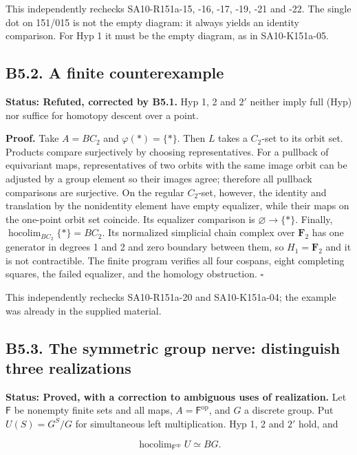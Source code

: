 This independently rechecks SA10-R151a-15, -16, -17, -19, -21 and -22.
The single dot on 151/015 is not the empty diagram: it always yields an
identity comparison. For Hyp 1 it must be the empty diagram, as in
SA10-K151a-05.

\subsection{B5.2. A finite
counterexample}\label{b5.2.-a-finite-counterexample}

\textbf{Status: Refuted, corrected by B5.1.} Hyp 1, 2 and \(2'\) neither
imply full (Hyp) nor suffice for homotopy descent over a point.

\textbf{Proof.} Take \(A=BC_2\) and \(\varphi(*)=\{*\}\). Then \(L\)
takes a \(C_2\)-set to its orbit set. Products compare surjectively by
choosing representatives. For a pullback of equivariant maps,
representatives of two orbits with the same image orbit can be adjusted
by a group element so their images agree; therefore all pullback
comparisons are surjective. On the regular \(C_2\)-set, however, the
identity and translation by the nonidentity element have empty
equalizer, while their maps on the one-point orbit set coincide. Its
equalizer comparison is \(\varnothing\to\{*\}\). Finally,
\(\operatorname{hocolim}_{BC_2}\{*\}=BC_2\). Its normalized simplicial
chain complex over \(\mathbf F_2\) has one generator in degrees 1 and 2
and zero boundary between them, so \(H_1=\mathbf F_2\) and it is not
contractible. The finite program verifies all four cospans, eight
completing squares, the failed equalizer, and the homology obstruction.
\(\square\)

This independently rechecks SA10-R151a-20 and SA10-K151a-04; the example
was already in the supplied material.

\subsection{B5.3. The symmetric group nerve: distinguish three
realizations}\label{b5.3.-the-symmetric-group-nerve-distinguish-three-realizations}

\textbf{Status: Proved, with a correction to ambiguous uses of
realization.} Let \(\mathsf F\) be nonempty finite sets and all maps,
\(A=\mathsf F^{\mathrm{op}}\), and \(G\) a discrete group. Put
\(U(S)=G^S/G\) for simultaneous left multiplication. Hyp 1, 2 and \(2'\)
hold, and

\[\operatorname{hocolim}_{\mathsf F^{\mathrm{op}}}U\simeq BG.\]

